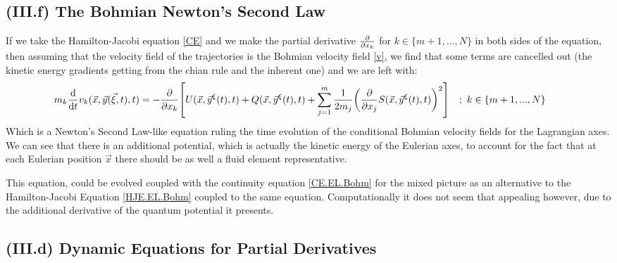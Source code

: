\documentclass[11pt, a4paper]{article} %
\begin{document}
\subsection*{(III.f) The Bohmian Newton's Second Law}
If we take the Hamilton-Jacobi equation \eqref{CE} and we make the partial derivative $\pdv{}{x_k}$ for $k\in\{m+1,...,N\}$ in both sides of the equation, then assuming that the velocity field of the trajectories is the Bohmian velocity field \eqref{v}, we find that some terms are cancelled out (the kinetic energy gradients getting from the chian rule and the inherent one) and we are left with:
\begin{equation}
\hspace{-0.6cm} m_k\dv{}{t}v_k(\vec{x},\vec{y}(\vec{\xi},t),t)=-\pdv{}{x_k}\qty[U(\vec{x},\vec{y}^\xi(t),t)+Q(\vec{x},\vec{y}^\xi(t),t)+\sum_{j=1}^m \frac{1}{2m_j}\qty(\pdv{}{x_j}S(\vec{x},\vec{y}^\xi(t),t))^2]\quad;\   k\in\{m+1,...,N\}
\end{equation}
Which is a Newton's Second Law-like equation ruling the time evolution of the conditional Bohmian velocity fields for the Lagrangian axes. We can see that there is an additional potential, which is actually the kinetic energy of the Eulerian axes, to account for the fact that at each Eulerian position $\vec{x}$ there should be as well a fluid element representative.

This equation, could be evolved coupled with the continuity equation \eqref{CE.EL.Bohm} for the mixed picture as an alternative to the Hamilton-Jacobi Equation \eqref{HJE.EL.Bohm} coupled to the same equation. Computationally it does not seem that appealing however, due to the additional derivative of the quantum potential it presents.


\subsection*{(III.d) Dynamic Equations for Partial Derivatives}\vspace{-0.2cm}
\end{document}
